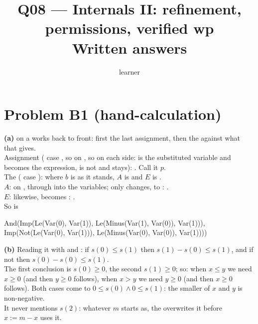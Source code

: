 \documentclass[11pt]{article}
\title{Q08 --- Internals II: refinement, permissions, verified wp \\ \large Written answers}
\author{learner}
\date{}
\begin{document}
\maketitle

\section*{Problem B1 (hand-calculation)}\label{ans:B1}
\begin{answer}
\textbf{(a)}  on a  works back to front: first the last
assignment, then the  against what that gives. \\
Assignment  ( case
, so  on , so  on each side:
 is the substituted variable and becomes the expression,
 is not and stays): . Call
it $p$. \\
The  ( case ): 
where $b$ is  as it stands, $A$ is
 and $E$ is . \\
$A$:  on ,  through  into the
variables; only  changes, to :
. \\
$E$: likewise,  becomes :
. \\
So  is
\begin{dafnycode}
And(Imp(Le(Var(0), Var(1)), Le(Minus(Var(1), Var(0)), Var(1))),
    Imp(Not(Le(Var(0), Var(1))), Le(Minus(Var(0), Var(0)), Var(1))))
\end{dafnycode}

\textbf{(b)} Reading it with  and : if $s(0) \leq s(1)$
then $s(1) - s(0) \leq s(1)$, and if not then $s(0) - s(0) \leq s(1)$. \\
The first conclusion is $s(0) \geq 0$, the second $s(1) \geq 0$; so: when $x
\leq y$ we need $x \geq 0$ (and then $y \geq 0$ follows), when $x > y$ we need
$y \geq 0$ (and then $x \geq 0$ follows). Both cases come to
$0 \leq s(0) \wedge 0 \leq s(1)$: the smaller of $x$ and $y$ is non-negative.
\\
It never mentions $s(2)$: whatever $m$ starts as, the  overwrites it
before $x := m - x$ uses it.


\end{answer}
\end{document}
